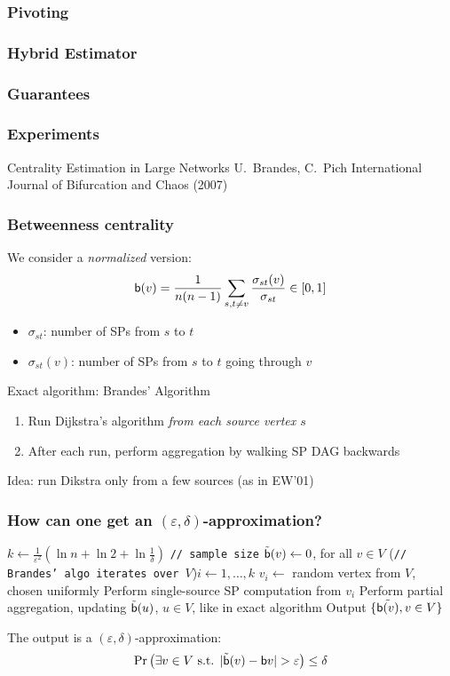 \begin{frame}
  \frametitle{Pivoting}
\end{frame}

\begin{frame}
  \frametitle{Hybrid Estimator}
\end{frame}

\begin{frame}
  \frametitle{Guarantees}
\end{frame}

\begin{frame}
  \frametitle{Experiments}
\end{frame}

\begin{frame}
  \centering
  \vfill
  {\Huge Centrality Estimation in Large Networks}
  \vfill
  {\Large U.~Brandes, C.~Pich}
  \vfill
  {\large International Journal of Bifurcation and Chaos (2007)}
  \vfill
\end{frame}

\begin{frame}
  \frametitle{Betweenness centrality}
  We consider a \emph{normalized} version:
  \[
    \mathsf{b}(v)=\frac{1}{n(n-1)}\sum_{s,t\neq v}\frac{\sigma_{st}(v)}{\sigma_{st}}\in[0,1]
  \]
  \begin{itemize}
    \item $\sigma_{st}$: number of SPs from $s$ to $t$
    \item $\sigma_{st}(v)$: number of SPs from $s$ to $t$ going through $v$
  \end{itemize}
  \pause
  Exact algorithm: Brandes' Algorithm
  \begin{enumerate}
    \item Run Dijkstra's algorithm \emph{from each source vertex $s$}
    \item After each run, perform aggregation by walking SP DAG backwards
  \end{enumerate}
  \pause
  Idea: run Dikstra only from a few sources (as in EW'01)
\end{frame}

\begin{frame}
  \frametitle{How can one get an $(\varepsilon,\delta)$-approximation?}
  \begin{algorithm}[H]
    \DontPrintSemicolon
    $k\leftarrow \frac{1}{\varepsilon^2}\left(\ln n + \ln 2 +
    \ln\frac{1}{\delta}\right)$ \texttt{// sample size}\;
    $\tilde{\mathsf{b}}(v)\leftarrow 0$, for all $v\in V$\;
    \For(\texttt{// Brandes' algo iterates over $V$}){$i\leftarrow 1,\dotsc,k$} {
      $v_i \leftarrow$ random vertex from $V$, chosen uniformly\;
      Perform single-source SP computation from $v_i$\;
      Perform partial aggregation, updating $\tilde{\mathsf{b}}(u)$, $u\in V$,
      like in exact algorithm\;
    }
    Output $\{\tilde{\mathsf{b}(v)}, v\in V\}$\;
  \end{algorithm}
  \vfill
  \pause
  \begin{theorem}
    The output is a $(\varepsilon,\delta)$-approximation:
    \[
      \Pr\left(\exists v\in V \text{ s.t. }
      |\tilde{\betw}(v)-\betw{v}|>\varepsilon\right)\le \delta
    \]
  \end{theorem}
\end{frame}

